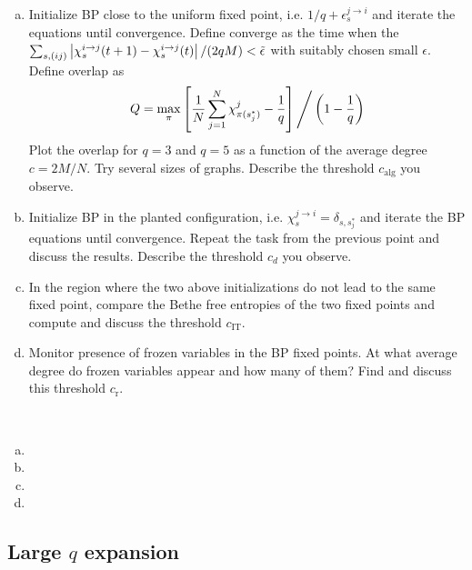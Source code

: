\documentclass[a4paper,oneside,12pt]{article}
\begin{document}
\begin{enumerate}[(a)]
\item
        Initialize BP close to the uniform fixed point, i.e. $ 1/q + \epsilon^{j\to i}_s $ and iterate the equations until convergence. 
        Define converge as the time when the $ \sum_{s,(ij)} \left|  \chi_s^{i\to j}(t+1) - \chi_s^{i\to j}(t)  \right|/ (2qM) < \tilde \epsilon $ with suitably chosen small $\epsilon$. 
        Define overlap as
        \begin{equation}
            Q = \max_\pi \left\lbrack  \frac{1}{N} \sum_{j=1}^N \chi_{\pi(s_j^*)}^j - \frac{1}{q}  \right\rbrack \Bigg/ \left(  1 - \frac{1}{q}  \right)
        \end{equation}
        Plot the overlap for $ q = 3 $ and $ q = 5 $ as a function of the average degree $ c = 2M/N $. 
        Try several sizes of graphs. 
        Describe the threshold $ c_{\mathrm{alg}}$ you observe.
\item
        Initialize BP in the planted configuration, i.e. $ \chi_s^{j\to i} = \delta_{s,s_j^*} $ and iterate the BP equations until convergence. 
        Repeat the task from the previous point and discuss the results. 
        Describe the threshold $ c_d $ you observe.
\item
        In the region where the two above initializations do not lead to the same fixed point, compare the Bethe free entropies of the two fixed points and compute and discuss the threshold $ c_{\mathrm{IT}} $.
\item
        Monitor presence of frozen variables in the BP fixed points. 
        At what average degree do frozen variables appear and how many of them? 
        Find and discuss this threshold $ c_{\mathrm{r}} $.
\end{enumerate}
\begin{solution} $\,$ 
\begin{enumerate}[(a)]
\item 
\item 
\item 
\item 
\end{enumerate}
\end{solution}



\subsection*{Large $ q $ expansion}
\end{document}
